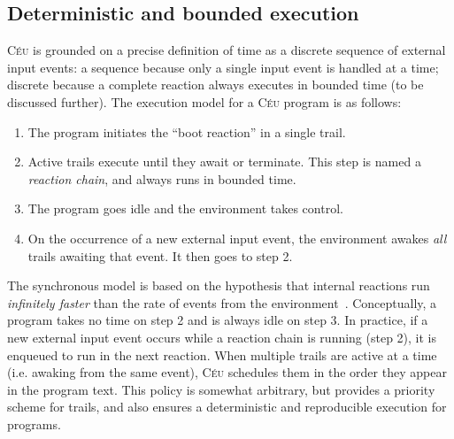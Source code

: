 \documentclass[10pt]{sensys-proc}
\newcommand{\CEU}{\textsc{C\'{e}u}\xspace}
\begin{document}
\begin{comment}
The same start/stop control pattern for the radio driver appears in all ported 
network protocols presented in Section~\ref{sec.eval}.
In practical terms, parallel compositions eliminated all state variables in our 
ports, not only those related to split-phase 
operations~\cite{wsn.protothreads}.
\end{comment}

\subsection{Deterministic and bounded execution}
\label{sec.ceu.det}


\CEU{} is grounded on a precise definition of time as a discrete sequence of 
external input events:
a sequence because only a single input event is handled at a time; discrete 
because a complete reaction always executes in bounded time (to be discussed 
further).
The execution model for a \CEU{} program is as follows:

\begin{enumerate}
\item The program initiates the ``boot reaction'' in a single trail.
\item Active trails execute until they await or terminate.
      This step is named a \emph{reaction chain}, and always runs in bounded 
      time.
\item The program goes idle and the environment takes control.
\item On the occurrence of a new external input event, the environment awakes 
      \emph{all} trails awaiting that event.
      It then goes to step 2.
\end{enumerate}

The synchronous model is based on the hypothesis that internal reactions run 
\emph{infinitely faster} than the rate of events from the 
environment~\cite{rp.hypothesis}.
Conceptually, a program takes no time on step 2 and is always idle on step 3.
In practice, if a new external input event occurs while a reaction chain is 
running (step 2), it is enqueued to run in the next reaction.
%
%
When multiple trails are active at a time (i.e. awaking from the same event), 
\CEU schedules them in the order they appear in the program text.
This policy is somewhat arbitrary, but provides a priority scheme for trails, 
and also ensures a deterministic and reproducible execution for programs.
\end{document}

